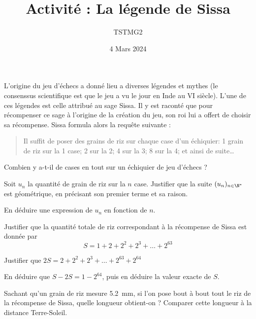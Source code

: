 \documentclass{article}
\title{Activité : La légende de Sissa}
\author{TSTMG2}
\date{4 Mars 2024}
\begin{document}
\maketitle

\begin{tcolorbox}
L'origine du jeu d'échecs a donné lieu a diverses légendes et mythes (le consenssus scientifique est que le jeu a vu le jour en Inde au VI\ieme{} siècle). L'une de ces légendes est celle attribué au sage Sissa. Il y est raconté que pour récompenser ce sage à l'origine de la création du jeu, son roi lui a offert de choisir sa récompense. Sissa formula alors la requête suivante :
\begin{quote}
Il suffit de poser des grains de riz sur chaque case d'un échiquier: 1 grain de riz sur la 1\iere{} case; 2 sur la 2\ieme{}; 4 sur la 3\ieme{}; 8 sur la 4\ieme{}; et ainsi de suite\dots
\end{quote}
\end{tcolorbox}
\begin{enumquestions}
\item Combien y a-t-il de cases en tout sur un échiquier de jeu d'échecs ?
\item Soit $u_n$ la quantité de grain de riz sur la $n$\ieme{} case. Justifier que la suite $(u_n)_{n \in \N^*}$ est géométrique, en précisant son premier terme et sa raison.
\item En déduire une expression de $u_n$ en fonction de $n$.
\item Justifier que la quantité totale de riz correspondant à la récompense de Sissa est donnée par
\begin{equation*}
S = 1 + 2 + 2^2 + 2^3 + \dots + 2^{63}
\end{equation*}
\item Justifier que $2S = 2 + 2^2 + 2^3 + \dots + 2^{63} + 2^{64}$
\item En déduire que $S - 2S = 1 - 2^{64}$, puis en déduire la valeur exacte de $S$.
\item Sachant qu'un grain de riz mesure \qty{5,2}{\milli\meter}, si l'on pose bout à bout tout le riz de la récompense de Sissa, quelle longueur obtient-on ? Comparer cette longueur à la distance Terre-Soleil.
\end{enumquestions}
\end{document}

